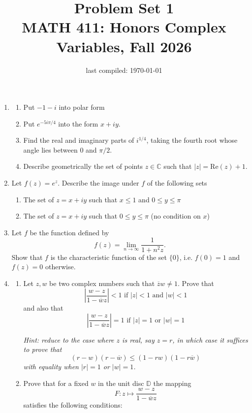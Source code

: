 \documentclass[12pt, reqno]{amsart}
\title{Problem Set 1 \\ MATH 411: Honors Complex Variables, Fall 2026}
\date{last compiled: \today}
\theoremstyle{definition}
\numberwithin{equation}{subsection}
\newcommand{\rr}{\rightarrow}
\renewcommand{\Re}{\mathrm{Re}}
\numberwithin{equation}{section}
\begin{document}
\maketitle



\begin{enumerate}

\item
\begin{enumerate} 

\item Put $-1 - i$ into polar form
\item Put $e^{- 5 i \pi /4}$ into the form $x + i y$.
\item Find the real and imaginary parts of $i^{1/4}$, taking the fourth root whose angle lies between $0$ and $\pi/2$.
\item Describe geometrically the set of points $z \in \mathbb{C}$ such that $|z| = \Re(z)+1$.
\end{enumerate} 
\item Let $f(z) = e^z$. Describe the image under $f$ of the following sets 
\begin{enumerate}
\item The set of $z = x + i y $ such that $x \leq 1$ and $0 \leq y \leq \pi$
\item The set of $z = x + i y $ such that $0 \leq y \leq \pi$ (no condition on $x$)
\end{enumerate}

\item Let $f$ be the function defined by $$ f(z) = \lim_{ n \rr \infty} \frac{1}{1 + n^2 z} .$$
 Show that $f$ is the characteristic function of the set $\{ 0 \}$, i.e. $f(0)=1$ and $f(z)=0$ otherwise. 
 
 \item \begin{enumerate}
\item Let $z, w$ be two complex numbers such that $\overline{z} w \neq 1$. Prove that $$ \left| \frac{w -z }{1 - \overline{w} z} \right| < 1 \text{ if } |z| < 1 \text{ and } |w| < 1 $$ and also that $$ \left| \frac{w -z }{1 - \overline{w} z} \right| = 1 \text{ if } |z| = 1 \text{ or } |w| = 1 $$ 

\emph{Hint: reduce to the case where $z$ is real, say $z=r$, in which case it suffices to prove that $$ (r - w) (r - \overline{w}) \leq ( 1- rw) (1 - r \overline{w}) $$ with equality when $|r|=1$ or $|w|=1$.}

\item Prove that for a fixed $w$ in the unit disc $\mathbb{D}$ the mapping $$ F: z \mapsto \frac{w - z}{1 - \overline{w} z} $$ satisfies the following conditions: 


\end{enumerate}
\end{enumerate}
\end{document}
